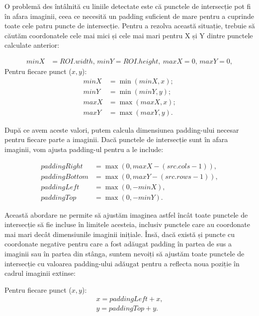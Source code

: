 \documentclass[a4paper,12pt]{report}
\begin{document}
O problemă des întâlnită cu liniile detectate este că punctele de intersecție pot fi în afara imaginii, ceea ce necesită un padding suficient de mare pentru a cuprinde toate cele patru puncte de intersecție. Pentru a rezolva această situație, trebuie să căutăm coordonatele cele mai mici și cele mai mari pentru X și Y dintre punctele calculate anterior:

\[
    \begin{aligned}
        minX & = ROI.width, \, minY = ROI.height, \ maxX = 0, \, maxY = 0,
    \end{aligned}
\]
Pentru fiecare punct (\(x, y\)):
\[
    \begin{aligned}
        minX & = \min(minX, x); \\
        minY & = \min(minY, y); \\
        maxX & = \max(maxX, x); \\
        maxY & = \max(maxY, y).
    \end{aligned}
\]

După ce avem aceste valori, putem calcula dimensiunea padding-ului necesar pentru fiecare parte a imaginii. Dacă punctele de intersecție sunt în afara imaginii, vom ajusta padding-ul pentru a le include:

\[
    \begin{aligned}
        paddingRight  & = \max(0, maxX - (src.cols - 1)), \\
        paddingBottom & = \max(0, maxY - (src.rows - 1)), \\
        paddingLeft   & = \max(0, -minX),                 \\
        paddingTop    & = \max(0, -minY).
    \end{aligned}
\]

Această abordare ne permite să ajustăm imaginea astfel încât toate punctele de intersecție să fie incluse în limitele acesteia, inclusiv punctele care au coordonate mai mari decât dimensiunile imaginii inițiale. Însă, dacă există și puncte cu coordonate negative pentru care a fost adăugat padding în partea de sus a imaginii sau în partea din stânga, suntem nevoiți să ajustăm toate punctele de intersecție cu valoarea padding-ului adăugat pentru a reflecta noua poziție în cadrul imaginii extinse:

Pentru fiecare punct (\(x, y\)):
\[
    \begin{aligned}
        x = paddingLeft + x, \\
        y = paddingTop + y.
    \end{aligned}
\]
\end{document}
